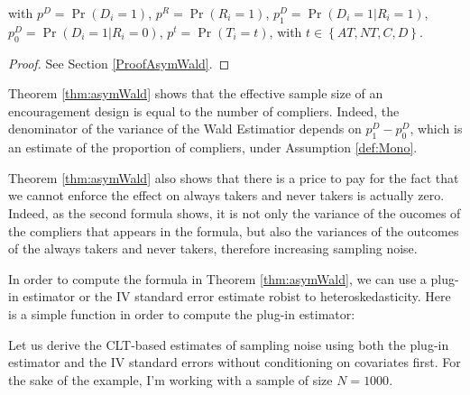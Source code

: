 \documentclass[]{book}
\theoremstyle{definition}
\theoremstyle{definition}
\theoremstyle{definition}
\theoremstyle{remark}
\let\BeginKnitrBlock\begin \let\EndKnitrBlock\end
\begin{document}
with \(p^D=\Pr(D_i=1)\), \(p^R=\Pr(R_i=1)\),
\(p^{D}_1=\Pr(D_i=1|R_i=1)\), \(p^{D}_0=\Pr(D_i=1|R_i=0)\),
\(p^t=\Pr(T_i=t)\), with \(t\in\left\{AT,NT,C,D\right\}\).

\BeginKnitrBlock{proof}
\iffalse{} {Proof. } \fi{}See Section \ref{ProofAsymWald}.
\EndKnitrBlock{proof}

\BeginKnitrBlock{remark}
\iffalse{} {Remark. } \fi{}Theorem \ref{thm:asymWald} shows that the
effective sample size of an encouragement design is equal to the number
of compliers. Indeed, the denominator of the variance of the Wald
Estimatior depends on \(p^D_1-p^D_0\), which is an estimate of the
proportion of compliers, under Assumption \ref{def:Mono}.

Theorem \ref{thm:asymWald} also shows that there is a price to pay for
the fact that we cannot enforce the effect on always takers and never
takers is actually zero. Indeed, as the second formula shows, it is not
only the variance of the oucomes of the compliers that appears in the
formula, but also the variances of the outcomes of the always takers and
never takers, therefore increasing sampling noise.
\EndKnitrBlock{remark}

\BeginKnitrBlock{remark}
\iffalse{} {Remark. } \fi{}In order to compute the formula in Theorem
\ref{thm:asymWald}, we can use a plug-in estimator or the IV standard
error estimate robist to heteroskedasticity. Here is a simple function
in order to compute the plug-in estimator:
\EndKnitrBlock{remark}

\BeginKnitrBlock{example}
\protect\hypertarget{exm:unnamed-chunk-134}{}{\label{exm:unnamed-chunk-134}
}Let us derive the CLT-based estimates of sampling noise using both the
plug-in estimator and the IV standard errors without conditioning on
covariates first. For the sake of the example, I'm working with a sample
of size \(N=1000\).
\EndKnitrBlock{example}
\end{document}
